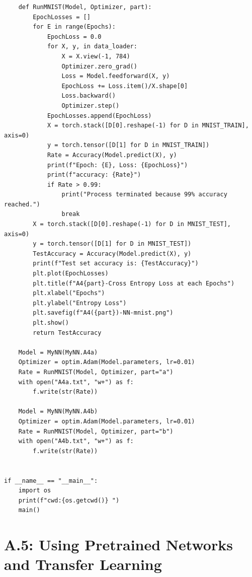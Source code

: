 \documentclass[]{article}
\begin{document}
\begin{lstlisting}
    def RunMNIST(Model, Optimizer, part):
        EpochLosses = []
        for E in range(Epochs):
            EpochLoss = 0.0
            for X, y, in data_loader:
                X = X.view(-1, 784)
                Optimizer.zero_grad()
                Loss = Model.feedforward(X, y)
                EpochLoss += Loss.item()/X.shape[0]
                Loss.backward()
                Optimizer.step()
            EpochLosses.append(EpochLoss)
            X = torch.stack([D[0].reshape(-1) for D in MNIST_TRAIN], axis=0)
            y = torch.tensor([D[1] for D in MNIST_TRAIN])
            Rate = Accuracy(Model.predict(X), y)
            print(f"Epoch: {E}, Loss: {EpochLoss}")
            print(f"accuracy: {Rate}")
            if Rate > 0.99:
                print("Process terminated because 99% accuracy reached.")
                break
        X = torch.stack([D[0].reshape(-1) for D in MNIST_TEST], axis=0)
        y = torch.tensor([D[1] for D in MNIST_TEST])
        TestAccuracy = Accuracy(Model.predict(X), y)
        print(f"Test set accuracy is: {TestAccuracy}")
        plt.plot(EpochLosses)
        plt.title(f"A4{part}-Cross Entropy Loss at each Epochs")
        plt.xlabel("Epochs")
        plt.ylabel("Entropy Loss")
        plt.savefig(f"A4({part})-NN-mnist.png")
        plt.show()
        return TestAccuracy

    Model = MyNN(MyNN.A4a)
    Optimizer = optim.Adam(Model.parameters, lr=0.01)
    Rate = RunMNIST(Model, Optimizer, part="a")
    with open("A4a.txt", "w+") as f:
        f.write(str(Rate))

    Model = MyNN(MyNN.A4b)
    Optimizer = optim.Adam(Model.parameters, lr=0.01)
    Rate = RunMNIST(Model, Optimizer, part="b")
    with open("A4b.txt", "w+") as f:
        f.write(str(Rate))


if __name__ == "__main__":
    import os
    print(f"cwd:{os.getcwd()} ")
    main()
    \end{lstlisting}

\section*{A.5: Using Pretrained Networks and Transfer Learning}
        
    
        
\end{document}
